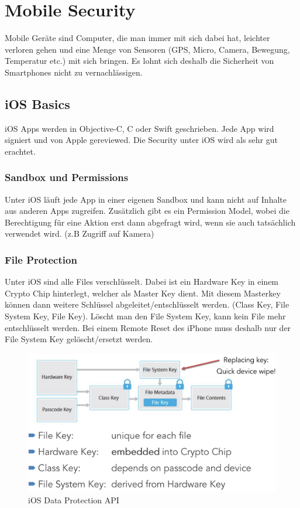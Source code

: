 \section{Mobile Security}
Mobile Geräte sind Computer, die man immer mit sich dabei hat, leichter verloren gehen und eine Menge von Sensoren (GPS, Micro, Camera, Bewegung, Temperatur etc.) mit sich bringen. Es lohnt sich deshalb die Sicherheit von Smartphones nicht zu vernachlässigen.

\subsection{iOS Basics}
iOS Apps werden in Objective-C, C oder Swift geschrieben. Jede App wird signiert und von Apple gereviewed. Die Security unter iOS wird als sehr gut erachtet.

\subsubsection{Sandbox und Permissions}
Unter iOS läuft jede App in einer eigenen Sandbox und kann nicht auf Inhalte aus anderen Apps zugreifen. Zusätzlich gibt es ein Permission Model, wobei die Berechtigung für eine Aktion erst dann abgefragt wird, wenn sie auch tatsächlich verwendet wird. (z.B Zugriff auf Kamera)

\subsubsection{File Protection}
Unter iOS sind alle Files verschlüsselt. Dabei ist ein Hardware Key in einem Crypto Chip hinterlegt, welcher als Master Key dient. Mit diesem Masterkey können dann weitere Schlüssel abgeleitet/entschlüsselt werden. (Class Key, File System Key, File Key). Löscht man den File System Key, kann kein File mehr entschlüsselt werden. Bei einem Remote Reset des iPhone muss deshalb nur der File System Key gelöscht/ersetzt werden.

\begin{figure}[h!]
	\centering
	\includegraphics[width=0.7\linewidth]{images/ios_encryption}
	\caption{iOS Data Protection API}
	\label{fig:iosencryption}
\end{figure}

